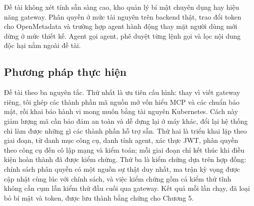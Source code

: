 Đề tài không xét tính sẵn sàng cao, kho quản lý bí mật chuyên dụng hay hiệu năng gateway. Phân quyền ở mức tài nguyên trên backend thật, trao đổi token cho OpenMetadata và trường hợp agent hành động thay mặt người dùng mới dừng ở mức thiết kế. Agent gọi agent, phê duyệt từng lệnh gọi và lọc nội dung độc hại nằm ngoài đề tài.

\subsection{Phương pháp thực hiện}

Đề tài theo ba nguyên tắc. Thứ nhất là ưu tiên cấu hình: thay vì viết gateway riêng, tôi ghép các thành phần mã nguồn mở vốn hiểu MCP và các chuẩn bảo mật, rồi khai báo hành vi mong muốn bằng tài nguyên Kubernetes. Cách này giảm lượng mã cần bảo đảm an toàn và dễ dựng lại ở máy khác, đổi lại hệ thống chỉ làm được những gì các thành phần hỗ trợ sẵn. Thứ hai là triển khai lặp theo giai đoạn, từ danh mục công cụ, danh tính agent, xác thực JWT, phân quyền theo công cụ đến cô lập mạng và kiểm toán; mỗi giai đoạn chỉ kết thúc khi điều kiện hoàn thành đã được kiểm chứng. Thứ ba là kiểm chứng dựa trên hợp đồng: chính sách phân quyền có một nguồn sự thật duy nhất, ma trận kỳ vọng được cập nhật cùng lúc với chính sách, và việc kiểm chứng gồm cả kiểm thử tĩnh không cần cụm lẫn kiểm thử đầu cuối qua gateway. Kết quả mỗi lần chạy, đã loại bỏ bí mật và token, được lưu thành bằng chứng cho Chương 5.

